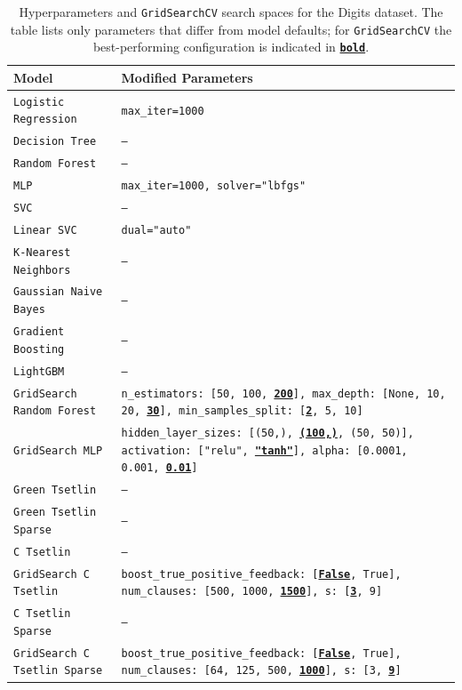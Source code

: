 \begin{table}[!htbp]
\centering
\caption[Digits hyperparameters]{Hyperparameters and \texttt{GridSearchCV} search spaces for the Digits dataset. The table lists only parameters that differ from model defaults; for \texttt{GridSearchCV} the best-performing configuration is indicated in \texttt{\textbf{\underline{bold}}}\label{tab:digits-params}.}
\begin{tabularx}{\textwidth}{@{}l L@{}} \toprule
    \textbf{Model} & \textbf{Modified Parameters} \\ \midrule \midrule
    \texttt{Logistic Regression} & \texttt{max\_iter=1000} \\ \midrule
    \texttt{Decision Tree} & \texttt{---} \\ \midrule
    \texttt{Random Forest} & \texttt{---} \\ \midrule
    \texttt{MLP} & \texttt{max\_iter=1000, solver="lbfgs"} \\ \midrule
    \texttt{SVC} & \texttt{---} \\ \midrule
    \texttt{Linear SVC} & \texttt{dual="auto"} \\ \midrule
    \texttt{K-Nearest Neighbors} & \texttt{---} \\ \midrule
    \texttt{Gaussian Naive Bayes} & \texttt{---} \\ \midrule
    \texttt{Gradient Boosting} & \texttt{---} \\ \midrule
    \texttt{LightGBM} & \texttt{---} \\ \midrule
    \texttt{GridSearch Random Forest} & \texttt{n\_estimators: [50, 100, \textbf{\underline{200}}], max\_depth: [None, 10, 20, \textbf{\underline{30}}], min\_samples\_split: [\textbf{\underline{2}}, 5, 10]} \\ \midrule
    \texttt{GridSearch MLP} & \texttt{hidden\_layer\_sizes: [(50,), \textbf{\underline{(100,)}}, (50, 50)], activation: ["relu", \textbf{\underline{"tanh"}}], alpha: [0.0001, 0.001, \textbf{\underline{0.01}}]} \\ \midrule \midrule
    \texttt{Green Tsetlin} & \texttt{---}\\ \midrule
    \texttt{Green Tsetlin Sparse} & \texttt{---} \\ \midrule
    \texttt{C Tsetlin} & \texttt{---} \\ \midrule
    \texttt{GridSearch C Tsetlin} & \texttt{boost\_true\_positive\_feedback: [\textbf{\underline{False}}, True], num\_clauses: [500, 1000, \textbf{\underline{1500}}], s: [\textbf{\underline{3}}, 9]} \\ \midrule
    \texttt{C Tsetlin Sparse} & \texttt{---} \\ \midrule
    \texttt{GridSearch C Tsetlin Sparse} & \texttt{boost\_true\_positive\_feedback: [\textbf{\underline{False}}, True], num\_clauses: [64, 125, 500, \textbf{\underline{1000}}], s: [3, \textbf{\underline{9}}]} \\ \bottomrule
\end{tabularx}
\end{table}

